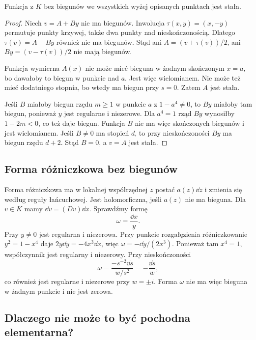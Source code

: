 \begin{lemat}
Funkcja z $K$ bez biegunów we wszystkich wyżej opisanych punktach jest stała.
\end{lemat}
\begin{proof}
Niech $v=A+By$ nie ma biegunów. Inwolucja $\tau(x,y)=(x,-y)$ permutuje punkty krzywej, także dwa punkty nad nieskończonością. Dlatego $\tau(v)=A-By$ również nie ma biegunów. Stąd ani $A=(v+\tau(v))/2$, ani $By=(v-\tau(v))/2$ nie mają biegunów.

Funkcja wymierna $A(x)$ nie może mieć bieguna w żadnym skończonym $x=a$, bo dawałoby to biegun w punkcie nad $a$. Jest więc wielomianem. Nie może też mieć dodatniego stopnia, bo wtedy ma biegun przy $s=0$. Zatem $A$ jest stała.

Jeśli $B$ miałoby biegun rzędu $m\ge1$ w punkcie $a$ z $1-a^4\ne0$, to $By$ miałoby tam biegun, ponieważ $y$ jest regularne i niezerowe. Dla $a^4=1$ rząd $By$ wynosiłby $1-2m<0$, co też daje biegun. Funkcja $B$ nie ma więc skończonych biegunów i jest wielomianem. Jeśli $B\ne0$ ma stopień $d$, to przy nieskończoności $By$ ma biegun rzędu $d+2$. Stąd $B=0$, a $v=A$ jest stała.
\end{proof}

\subsection{Forma różniczkowa bez biegunów}

Forma różniczkowa ma w lokalnej współrzędnej $z$ postać $a(z)\dd z$ i zmienia się według reguły łańcuchowej. Jest holomorficzna, jeśli $a(z)$ nie ma bieguna. Dla $v\in K$ mamy $\dd v=(Dv)\dd x$. Sprawdźmy formę
\[
\omega=\frac{\dd x}{y}.
\]
Przy $y\ne0$ jest regularna i niezerowa. Przy punkcie rozgałęzienia różniczkowanie $y^2=1-x^4$ daje $2y\dd y=-4x^3\dd x$, więc $\omega=-\dd y/(2x^3)$. Ponieważ tam $x^4=1$, współczynnik jest regularny i niezerowy. Przy nieskończoności
\[
\omega=\frac{-s^{-2}\dd s}{w/s^2}=-\frac{\dd s}{w},
\]
co również jest regularne i niezerowe przy $w=\pm i$. Forma $\omega$ nie ma więc bieguna w żadnym punkcie i nie jest zerowa.

\subsection{Dlaczego nie może to być pochodna elementarna?}

